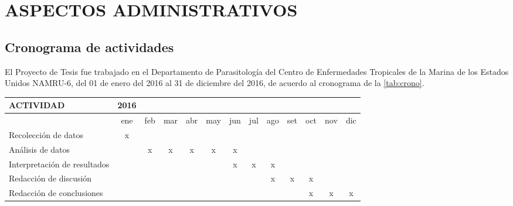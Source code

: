 \documentclass[a4paper]{article}
\begin{document}
\section{ASPECTOS ADMINISTRATIVOS}\label{aspectos-administrativos}

\subsection{Cronograma de actividades}\label{cronograma-de-actividades}

El Proyecto de Tesis fue trabajado en el Departamento de Parasitología
del Centro de Enfermedades Tropicales de la Marina de los Estados Unidos
NAMRU-6, del 01 de enero del 2016 al 31 de diciembre del 2016, de
acuerdo al cronograma de la \autoref{tab:crono}.

\begin{table}[ht]
        \label{tab:crono}
        \vspace{2mm}
\begin{center}
\begin{tabular}{lcccccccccccc}
  \hline
  \textbf{ACTIVIDAD} & 
  \textbf{2016} & & & & & & & & & & &\\
  \hline
  & 
  ene & feb & mar & abr & may & jun & jul & ago & set & oct & nov & dic\\
  \cline{2-13}
  Recolección de datos & 
  x & & & & & & & & & & &\\
  \cline{2-13}
  Análisis de datos & 
  & x & x & x & x & x & & & & & &\\
  \cline{2-13}
  Interpretación de resultados & 
  & & & & & x & x & x & & & &\\
  \cline{2-13}
  Redacción de discusión & 
  & & & & & & & x & x & x & &\\
  \cline{2-13}
  Redacción de conclusiones & 
  & & & & & & & & & x & x & x\\
  \hline
\end{tabular}
\end{center}
\end{table}
\end{document}
